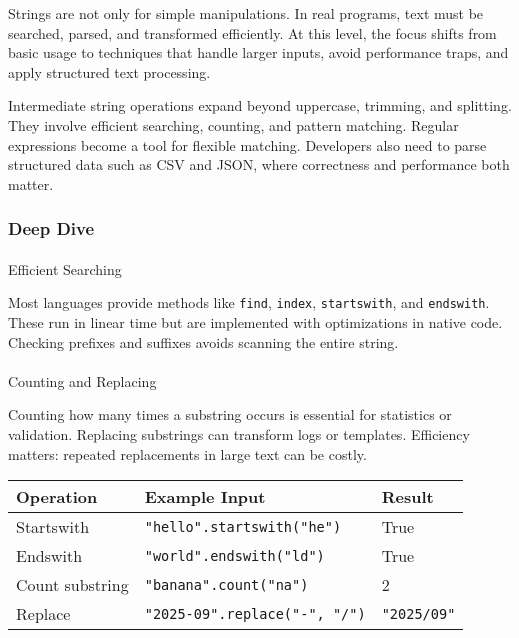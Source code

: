 \documentclass[
  letterpaper,
  DIV=11,
  numbers=noendperiod]{scrreprt}
\makeatletter
\let\oldparagraph\paragraph
\renewcommand{\paragraph}{
    \@ifstar
      \xxxParagraphStar
      \xxxParagraphNoStar
  }
\newcommand{\xxxParagraphStar}[1]{\oldparagraph*{#1}\mbox{}}
\newcommand{\xxxParagraphNoStar}[1]{\oldparagraph{#1}\mbox{}}
\makeatother
\begin{document}
Strings are not only for simple manipulations. In real programs, text
must be searched, parsed, and transformed efficiently. At this level,
the focus shifts from basic usage to techniques that handle larger
inputs, avoid performance traps, and apply structured text processing.

Intermediate string operations expand beyond uppercase, trimming, and
splitting. They involve efficient searching, counting, and pattern
matching. Regular expressions become a tool for flexible matching.
Developers also need to parse structured data such as CSV and JSON,
where correctness and performance both matter.

\subsubsection{Deep Dive}\label{deep-dive-26}

\paragraph{Efficient Searching}\label{efficient-searching}

Most languages provide methods like \texttt{find}, \texttt{index},
\texttt{startswith}, and \texttt{endswith}. These run in linear time but
are implemented with optimizations in native code. Checking prefixes and
suffixes avoids scanning the entire string.

\paragraph{Counting and Replacing}\label{counting-and-replacing}

Counting how many times a substring occurs is essential for statistics
or validation. Replacing substrings can transform logs or templates.
Efficiency matters: repeated replacements in large text can be costly.

\begin{longtable}[]{@{}lll@{}}
\toprule\noalign{}
Operation & Example Input & Result \\
\midrule\noalign{}
\endhead
\bottomrule\noalign{}
\endlastfoot
Startswith & \texttt{"hello".startswith("he")} & True \\
Endswith & \texttt{"world".endswith("ld")} & True \\
Count substring & \texttt{"banana".count("na")} & 2 \\
Replace & \texttt{"2025-09".replace("-",\ "/")} & \texttt{"2025/09"} \\
\end{longtable}
\end{document}
